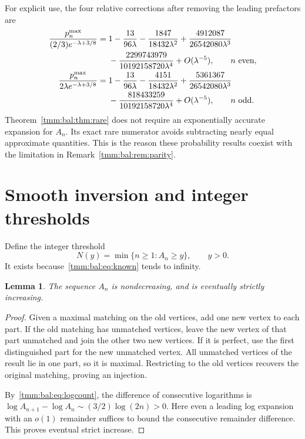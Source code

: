 \documentclass[11pt,letterpaper]{article}
\newtheorem{lemma}[theorem]{Lemma}
\theoremstyle{remark}\newtheorem{remark}[theorem]{Remark}
\begin{document}
For explicit use, the four relative corrections after removing the leading prefactors are
\begin{align}
 \frac{p_n^{\max}}{(2/3)e^{-\lambda+3/8}}
 ={}&1-\frac{13}{96\lambda}-\frac{1847}{18432\lambda^2}
 +\frac{4912087}{26542080\lambda^3}\notag\\
 &-\frac{2299743979}{10192158720\lambda^4}+O(\lambda^{-5}),
 \qquad n\text{ even},\label{tmm:bal:eq:even4}\\
 \frac{p_n^{\max}}{2\lambda e^{-\lambda+3/8}}
 ={}&1-\frac{13}{96\lambda}-\frac{4151}{18432\lambda^2}
 +\frac{5361367}{26542080\lambda^3}\notag\\
 &-\frac{818433259}{10192158720\lambda^4}+O(\lambda^{-5}),
 \qquad n\text{ odd}.\label{tmm:bal:eq:odd4}
\end{align}
Theorem~\ref{tmm:bal:thm:rare} does not require an exponentially accurate expansion for $A_n$. Its exact rare numerator avoids subtracting nearly equal approximate quantities. This is the reason these probability results coexist with the limitation in Remark~\ref{tmm:bal:rem:parity}.

\section{Smooth inversion and integer thresholds}\label{tmm:bal:sec:inverse}
Define the integer threshold
\begin{equation}\label{tmm:bal:eq:N}
 N(y)=\min\{n\ge1:A_n\ge y\},\qquad y>0.
\end{equation}
It exists because~\eqref{tmm:bal:eq:known} tends to infinity.

\begin{lemma}\label{tmm:bal:lem:monotone}
The sequence $A_n$ is nondecreasing, and is eventually strictly increasing.
\end{lemma}
\begin{proof}
Given a maximal matching on the old vertices, add one new vertex to each part. If the old matching has unmatched vertices, leave the new vertex of that part unmatched and join the other two new vertices. If it is perfect, use the first distinguished part for the new unmatched vertex. All unmatched vertices of the result lie in one part, so it is maximal. Restricting to the old vertices recovers the original matching, proving an injection.

By~\eqref{tmm:bal:eq:logcount}, the difference of consecutive logarithms is
$\log A_{n+1}-\log A_n\sim(3/2)\log(2n)>0$. Here even a leading log expansion with an $o(1)$ remainder suffices to bound the consecutive remainder difference. This proves eventual strict increase.
\end{proof}
\end{document}
